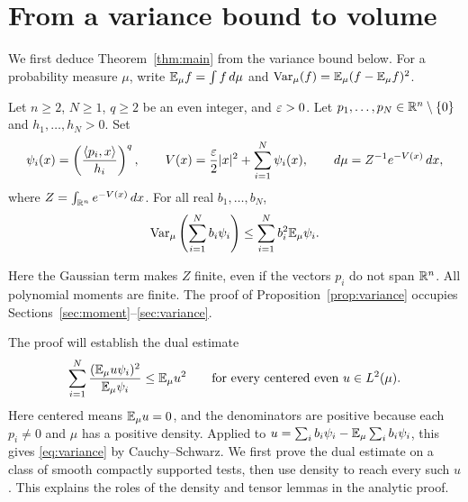 \section{From a variance bound to volume}
\label{sec:reduction}

We first deduce Theorem~\ref{thm:main} from the variance bound below.
For a probability measure $\mu$, write
$\mathbb E_\mu f=\int f\,d\mu$ and
$\operatorname{Var}_\mu(f)=\mathbb E_\mu(f-\mathbb E_\mu f)^2$.

\begin{proposition}\label{prop:variance}
Let $n\ge2$, $N\ge1$, $q\ge2$ be an even integer, and $\varepsilon>0$.
Let $p_1,\ldots,p_N\in\mathbb R^n\setminus\{0\}$ and $h_1,\ldots,h_N>0$.
Set
\begin{equation}\label{eq:potential}
 \psi_i(x)=\left(\frac{\langle p_i,x\rangle}{h_i}\right)^q,
 \qquad V(x)=\frac{\varepsilon}{2}|x|^2+\sum_{i=1}^N\psi_i(x),
 \qquad d\mu=Z^{-1}e^{-V(x)}\,dx,
\end{equation}
where $Z=\int_{\mathbb R^n}e^{-V(x)}\,dx$. For all real $b_1,\ldots,b_N$,
\begin{equation}\label{eq:variance}
 \operatorname{Var}_\mu\left(\sum_{i=1}^N b_i\psi_i\right)
 \le\sum_{i=1}^N b_i^2\mathbb E_\mu\psi_i.
\end{equation}
\end{proposition}

Here the Gaussian term makes $Z$ finite, even if the vectors $p_i$
do not span $\mathbb R^n$. All polynomial moments are finite. The proof of
Proposition~\ref{prop:variance} occupies Sections~\ref{sec:moment}--\ref{sec:variance}.


The proof will establish the dual estimate
\[
 \sum_{i=1}^N\frac{(\mathbb E_\mu u\psi_i)^2}{\mathbb E_\mu\psi_i}
 \le \mathbb E_\mu u^2
 \qquad\text{for every centered even }u\in L^2(\mu).
\]
Here centered means $\mathbb E_\mu u=0$, and the denominators are positive
because each $p_i\ne0$ and $\mu$ has a positive density.
Applied to $u=\sum_i b_i\psi_i-\mathbb E_\mu\sum_i b_i\psi_i$, this gives
\eqref{eq:variance} by Cauchy--Schwarz.  We first prove the dual estimate
on a class of smooth compactly supported tests, then use density to
reach every such $u$.  This explains the roles of the density and
tensor lemmas in the analytic proof.

